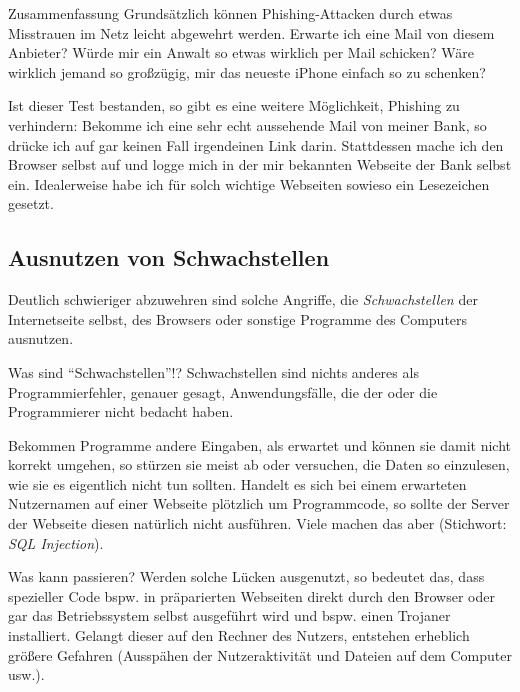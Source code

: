 \documentclass[utf8]{beamer}
\begin{document}
	\begin{frame}{Zusammenfassung}
		Grundsätzlich können Phishing-Attacken durch etwas Misstrauen im Netz leicht abgewehrt werden. Erwarte ich eine Mail von diesem Anbieter? Würde mir ein Anwalt so etwas wirklich per Mail schicken? Wäre wirklich jemand so großzügig, mir das neueste iPhone einfach so zu schenken?
		
		Ist dieser Test bestanden, so gibt es eine weitere Möglichkeit, Phishing zu verhindern: Bekomme ich eine sehr echt aussehende Mail von meiner Bank, so drücke ich auf gar keinen Fall irgendeinen Link darin. Stattdessen mache ich den Browser selbst auf und logge mich in der mir bekannten Webseite der Bank selbst ein. Idealerweise habe ich für solch wichtige Webseiten sowieso ein Lesezeichen gesetzt.
	\end{frame}
	
	\subsection{Ausnutzen von Schwachstellen}
	\begin{frame}
		Deutlich schwieriger abzuwehren sind solche Angriffe, die \emph{Schwachstellen} der Internetseite selbst, des Browsers oder sonstige Programme des Computers ausnutzen.
	\end{frame}

	\begin{frame}{Was sind \enquote{Schwachstellen}!?}
		Schwachstellen sind nichts anderes als Programmierfehler, genauer gesagt, Anwendungsfälle, die der oder die Programmierer nicht bedacht haben. 
		
		Bekommen Programme andere Eingaben, als erwartet und können sie damit nicht korrekt umgehen, so stürzen sie meist ab oder versuchen, die Daten so einzulesen, wie sie es eigentlich nicht tun sollten. Handelt es sich bei einem erwarteten Nutzernamen auf einer Webseite plötzlich um Programmcode, so sollte der Server der Webseite diesen natürlich nicht ausführen. Viele machen das aber (Stichwort: \emph{SQL Injection}).		
	\end{frame}

	\begin{frame}{Was kann passieren?}
		Werden solche Lücken ausgenutzt, so bedeutet das, dass spezieller Code bspw. in präparierten Webseiten direkt durch den Browser oder gar das Betriebssystem selbst ausgeführt wird und bspw. einen Trojaner installiert. Gelangt dieser auf den Rechner des Nutzers, entstehen erheblich größere Gefahren (Ausspähen der Nutzeraktivität und Dateien auf dem Computer usw.).
	\end{frame}
\end{document}
